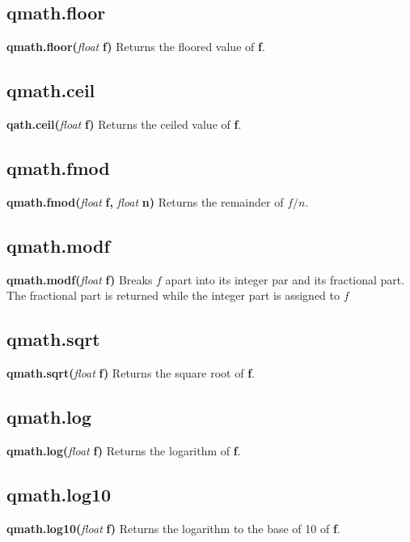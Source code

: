 \documentclass{scrreprt}
\begin{document}
\subsection{qmath.floor}
\label{qm-floor}
\textbf{qmath.floor(}\textit{float}\textbf{ f)}
\newline
Returns the floored value of \textbf{f}.
\subsection{qmath.ceil}
\label{qm-ceil}
\textbf{qath.ceil(}\textit{float}\textbf{ f)}
\newline
Returns the ceiled value of \textbf{f}.
\subsection{qmath.fmod}
\label{qm-fmod}
\textbf{qmath.fmod(}\textit{float}\textbf{ f, }\textit{float}\textbf{ n)}
\newline
Returns the remainder of \begin{math}f/n.\end{math}
\subsection{qmath.modf}
\label{qm-modf}
\textbf{qmath.modf(}\textit{float}\textbf{ f)}
\newline
Breaks \begin{math}f\end{math} apart into its integer par and its fractional part. The fractional part is returned while the integer part is assigned to \begin{math}f\end{math}
\subsection{qmath.sqrt}
\label{qm-sqrt}
\textbf{qmath.sqrt(}\textit{float}\textbf{ f)}
\newline
Returns the square root of \textbf{f}.
\subsection{qmath.log}
\label{qm-log}
\textbf{qmath.log(}\textit{float}\textbf{ f)}
\newline
Returns the logarithm of \textbf{f}.
\subsection{qmath.log10}
\label{qm-log10}
\textbf{qmath.log10(}\textit{float}\textbf{ f)}
\newline
Returns the logarithm to the base of 10 of \textbf{f}.
\end{document}
